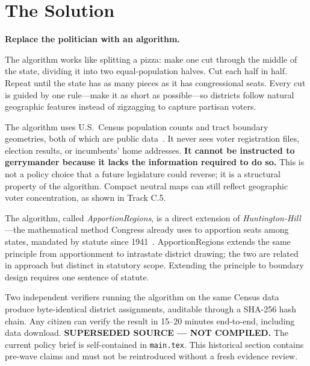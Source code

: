 
\section{The Solution}

\noindent\textbf{Replace the politician with an algorithm.}

\medskip
\noindent
The algorithm works like splitting a pizza: make one cut through the
middle of the state, dividing it into two equal-population halves.
Cut each half in half.
Repeat until the state has as many pieces as it has congressional seats.
Every cut is guided by one rule---make it as short as possible---so
districts follow natural geographic features instead of zigzagging to
capture partisan voters.

\medskip
\noindent
The algorithm uses U.S.\ Census population counts and tract boundary
geometries, both of which are public data~\cite{census2020pl}.
It never sees voter registration files, election results, or incumbents'
home addresses.
\textbf{It cannot be instructed to gerrymander because it lacks the information
required to do so.}
This is not a policy choice that a future legislature could reverse;
it is a structural property of the algorithm. Compact neutral maps can still
reflect geographic voter concentration, as shown in Track C.5.

\medskip
\noindent
The algorithm, called \textit{ApportionRegions}, is a direct extension of
\textit{Huntington-Hill}---the mathematical method Congress already uses to
apportion seats among states, mandated by statute since
1941~\cite{huntingtonHill1941}.
ApportionRegions extends the same principle from apportionment to intrastate
district drawing; the two are related in approach but distinct in statutory
scope.
Extending the principle to boundary design requires one sentence of statute.

\medskip
\noindent
Two independent verifiers running the algorithm on the same Census data
produce byte-identical district assignments, auditable through a
SHA-256 hash chain.
Any citizen can verify the result in 15--20 minutes end-to-end,
including data download.
\noindent\textbf{SUPERSEDED SOURCE --- NOT COMPILED.} The current policy brief
is self-contained in \texttt{main.tex}. This historical section contains
pre-wave claims and must not be reintroduced without a fresh evidence review.
